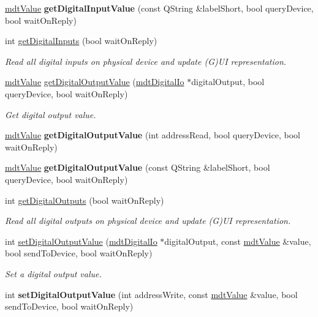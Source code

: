 \begin{DoxyCompactItemize}
\item 
\hypertarget{classmdt_device_a295a2795695804cc291282d92a1c7641}{
\hyperlink{classmdt_value}{mdtValue} {\bfseries getDigitalInputValue} (const QString \&labelShort, bool queryDevice, bool waitOnReply)}
\label{classmdt_device_a295a2795695804cc291282d92a1c7641}

\item 
int \hyperlink{classmdt_device_a6e338b959c86591b6b3401f925c49050}{getDigitalInputs} (bool waitOnReply)
\begin{DoxyCompactList}\small\item\em Read all digital inputs on physical device and update (G)UI representation. \end{DoxyCompactList}\item 
\hyperlink{classmdt_value}{mdtValue} \hyperlink{classmdt_device_a978bde9f2b6177b6f3742163e7a712a9}{getDigitalOutputValue} (\hyperlink{classmdt_digital_io}{mdtDigitalIo} $\ast$digitalOutput, bool queryDevice, bool waitOnReply)
\begin{DoxyCompactList}\small\item\em Get digital output value. \end{DoxyCompactList}\item 
\hypertarget{classmdt_device_adf8160df55a9eb9ba6820e24bb7f1440}{
\hyperlink{classmdt_value}{mdtValue} {\bfseries getDigitalOutputValue} (int addressRead, bool queryDevice, bool waitOnReply)}
\label{classmdt_device_adf8160df55a9eb9ba6820e24bb7f1440}

\item 
\hypertarget{classmdt_device_a5e7b7de4243f45d8cfa42599d51555bf}{
\hyperlink{classmdt_value}{mdtValue} {\bfseries getDigitalOutputValue} (const QString \&labelShort, bool queryDevice, bool waitOnReply)}
\label{classmdt_device_a5e7b7de4243f45d8cfa42599d51555bf}

\item 
int \hyperlink{classmdt_device_ab35b81b8eb68e161ac06ae882be39a25}{getDigitalOutputs} (bool waitOnReply)
\begin{DoxyCompactList}\small\item\em Read all digital outputs on physical device and update (G)UI representation. \end{DoxyCompactList}\item 
int \hyperlink{classmdt_device_a04564fd9be440c026e7c399f0e619485}{setDigitalOutputValue} (\hyperlink{classmdt_digital_io}{mdtDigitalIo} $\ast$digitalOutput, const \hyperlink{classmdt_value}{mdtValue} \&value, bool sendToDevice, bool waitOnReply)
\begin{DoxyCompactList}\small\item\em Set a digital output value. \end{DoxyCompactList}\item 
\hypertarget{classmdt_device_a5c2514c3c31a687a01a898c874d2c45e}{
int {\bfseries setDigitalOutputValue} (int addressWrite, const \hyperlink{classmdt_value}{mdtValue} \&value, bool sendToDevice, bool waitOnReply)}
\label{classmdt_device_a5c2514c3c31a687a01a898c874d2c45e}


\end{DoxyCompactItemize}
